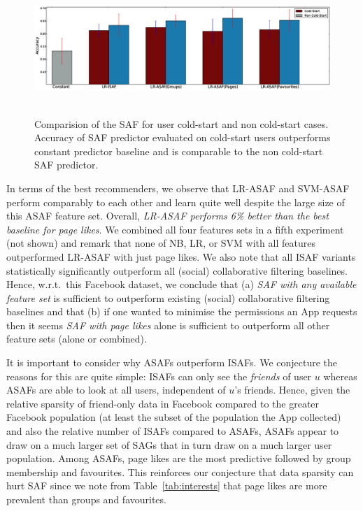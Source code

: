 \begin{figure}[tbh!]
\centering
\includegraphics[width=180mm,height=50mm]{data/plots/new/cold_start.eps}
\vspace{-6mm}
\caption{Comparision of the SAF for user cold-start and non cold-start cases. Accuracy of SAF predictor evaluated on
cold-start users outperforms constant predictor baseline and is
comparable to the non cold-start SAF predictor.}
\label{fig:coldstart}
\end{figure}
 

In terms of the best recommenders, we observe that LR-ASAF and
SVM-ASAF perform comparably to each other and learn quite well despite
the large size of this ASAF feature set.  Overall, \emph{LR-ASAF
  performs 6\% better than the best baseline for page likes}.  We
combined all four features sets in a fifth experiment (not shown) and
remark that none of NB, LR, or SVM with all features outperformed
LR-ASAF with just page likes.  We also note that all ISAF variants
statistically significantly outperform all (social) collaborative
filtering baselines.  Hence, w.r.t.\ this Facebook dataset, we
conclude that (a) \emph{SAF with any available feature set} is sufficient
to outperform existing (social) collaborative filtering baselines and
that (b) if one wanted to minimise the permissions an App requests
then it seems \emph{SAF with page likes} alone is sufficient to
outperform all other feature sets (alone or combined).

It is important to consider why ASAFs outperform ISAFs.  We conjecture
the reasons for this are quite simple: ISAFs can only see the
\emph{friends} of user $u$ whereas ASAFs are able to look at all
users, independent of $u$'s friends.  Hence, given the relative
sparsity of friend-only data in Facebook compared to the greater
Facebook population (at least the subset of the population the App
collected) and also the relative number of ISAFs compared to ASAFs,
ASAFs appear to draw on a much larger set of SAGs that in turn draw on
a much larger user population.  Among ASAFs, page likes are the most
predictive followed by group membership and favourites.  This
reinforces our conjecture that data sparsity can hurt SAF since we
note from Table~\ref{tab:interests} that page likes are more prevalent
than groups and favourites.

